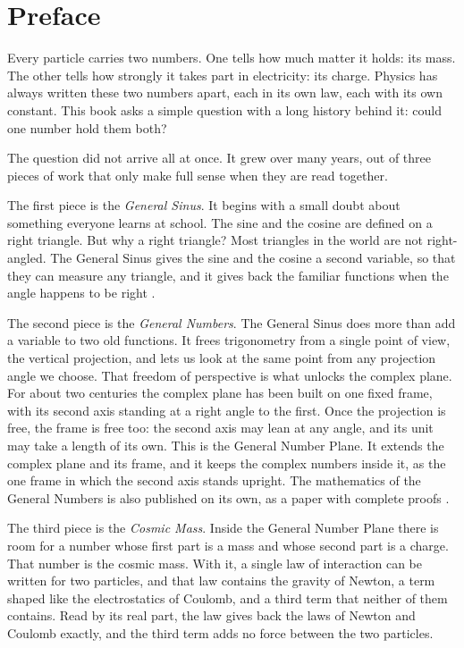 \chapter*{Preface}

Every particle carries two numbers. One tells how much matter it holds: its mass. The other tells how strongly it takes part in electricity: its charge. Physics has always written these two numbers apart, each in its own law, each with its own constant. This book asks a simple question with a long history behind it: could one number hold them both?

The question did not arrive all at once. It grew over many years, out of three pieces of work that only make full sense when they are read together.

The first piece is the \emph{General Sinus}. It begins with a small doubt about something everyone learns at school. The sine and the cosine are defined on a right triangle. But why a right triangle? Most triangles in the world are not right-angled. The General Sinus gives the sine and the cosine a second variable, so that they can measure any triangle, and it gives back the familiar functions when the angle happens to be right \citep{Derraz2026GSP}.


The second piece is the \emph{General Numbers}. The General Sinus does more than add a variable to two old functions. It frees trigonometry from a single point of view, the vertical projection, and lets us look at the same point from any projection angle we choose. That freedom of perspective is what unlocks the complex plane. For about two centuries the complex plane has been built on one fixed frame, with its second axis standing at a right angle to the first. Once the projection is free, the frame is free too: the second axis may lean at any angle, and its unit may take a length of its own. This is the General Number Plane. It extends the complex plane and its frame, and it keeps the complex numbers inside it, as the one frame in which the second axis stands upright. The mathematics of the General Numbers is also published on its own, as a paper with complete proofs \citep{DerrazGNPreprint2026}.

The third piece is the \emph{Cosmic Mass}. Inside the General Number Plane there is room for a number whose first part is a mass and whose second part is a charge. That number is the cosmic mass. With it, a single law of interaction can be written for two particles, and that law contains the gravity of Newton, a term shaped like the electrostatics of Coulomb, and a third term that neither of them contains. Read by its real part, the law gives back the laws of Newton and Coulomb exactly, and the third term adds no force between the two particles.

